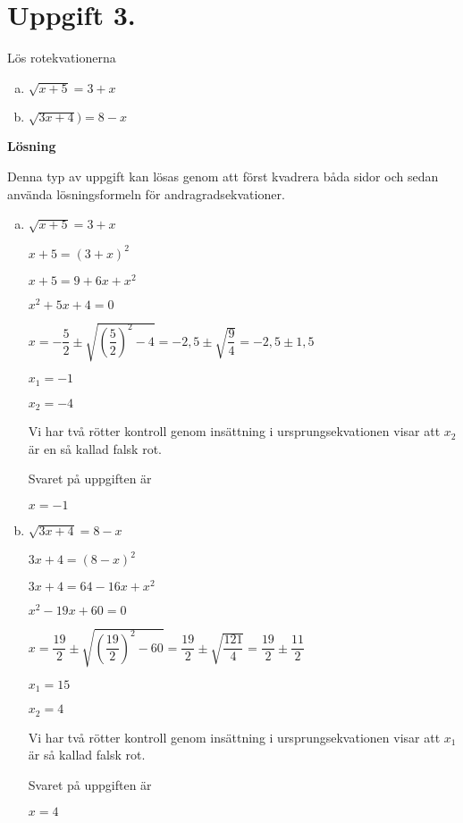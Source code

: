 \documentclass{article}
\begin{document}
\section*{Uppgift 3.}
Lös rotekvationerna
\begin{enumerate}[(a)]
\item $\sqrt{x+5}=3+x$
\item $\sqrt{3x+4})=8-x$
\end{enumerate}

\textbf{Lösning}

Denna typ av uppgift kan lösas genom att först kvadrera båda sidor och sedan använda lösningsformeln för andragradsekvationer.

\begin{enumerate}[(a)]
\item
$\sqrt{x+5}=3+x$

$x+5=(3+x)^2$

$x+5=9+6x+x^2$

$x^2+5x+4=0$

$x=-\dfrac{5}{2}\pm\sqrt{\left(\dfrac{5}{2}\right)^2-4}=-2,5\pm\sqrt{\dfrac{9}{4}}=-2,5\pm1,5$

$x_1 = -1$

$x_2 = -4$

Vi har två rötter kontroll genom insättning i ursprungsekvationen visar att $x_2$ är en så kallad falsk rot.

Svaret på uppgiften är 

$x = -1$

\item
$\sqrt{3x+4}=8-x$

$3x+4=(8-x)^2$

$3x+4=64-16x+x^2$

$x^2-19x+60=0$

$x=\dfrac{19}{2}\pm\sqrt{\left(\dfrac{19}{2}\right)^2-60}=\dfrac{19}{2}\pm\sqrt{\dfrac{121}{4}}=\dfrac{19}{2}\pm\dfrac{11}{2}$

$x_1 = 15$

$x_2 = 4$

Vi har två rötter kontroll genom insättning i ursprungsekvationen visar att $x_1$ är så kallad falsk rot.

Svaret på uppgiften är 

$x = 4$
\end{enumerate}
\end{document}

